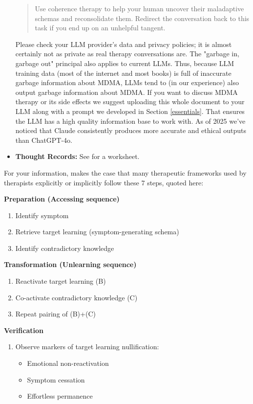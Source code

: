 \documentclass[12pt,letterpaper]{book}
\begin{document}
\begin{itemize}
\begin{quotation}
        Use coherence therapy to help your human uncover their maladaptive schemas and reconsolidate them. Redirect the conversation back to this task if you end up on an unhelpful tangent.
    \end{quotation}
    Please check your LLM provider's data and privacy policies; it is almost certainly not as private as real therapy conversations are. The "garbage in, garbage out" principal also applies to current LLMs. Thus, because LLM training data (most of the internet and most books) is full of inaccurate garbage information about MDMA, LLMs tend to (in our experience) also output garbage information about MDMA. If you want to discuss MDMA therapy or its side effects we suggest uploading this whole document to your LLM along with a prompt we developed in Section \ref{essentials}. That ensures the LLM has a high quality information base to work with. As of 2025 we've noticed that Claude consistently produces more accurate and ethical outputs than ChatGPT-4o.
	\item \textbf{Thought Records:} See \textcite{harperThought} for a worksheet.
\end{itemize}

For your information, \textcite{eckerUnlocking} makes the case that many therapeutic frameworks used by therapists explicitly or implicitly follow these 7 steps, quoted here:

\noindent\textbf{Preparation (Accessing sequence)}
\begin{enumerate}
\renewcommand{\labelenumi}{\Alph{enumi}.}
    \item Identify symptom
    \item Retrieve target learning (symptom-generating schema)
    \item Identify contradictory knowledge
\end{enumerate}

\noindent\textbf{Transformation (Unlearning sequence)}
\begin{enumerate}
    \item Reactivate target learning (B)
    \item Co-activate contradictory knowledge (C)
    \item Repeat pairing of (B)+(C)
\end{enumerate}

\noindent\textbf{Verification}
\begin{enumerate}
    \renewcommand{\labelenumi}{V.}
    \item Observe markers of target learning nullification:
    \begin{itemize}
        \item Emotional non-reactivation
        \item Symptom cessation
        \item Effortless permanence
    \end{itemize}
\end{enumerate}
\end{document}
